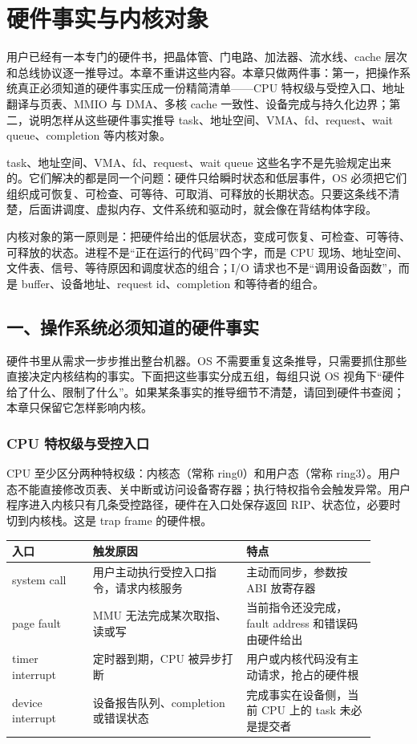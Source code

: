 \chapter{硬件事实与内核对象}

用户已经有一本专门的硬件书，把晶体管、门电路、加法器、流水线、cache 层次和总线协议逐一推导过。本章不重讲这些内容。本章只做两件事：第一，把操作系统真正必须知道的硬件事实压成一份精简清单——CPU 特权级与受控入口、地址翻译与页表、MMIO 与 DMA、多核 cache 一致性、设备完成与持久化边界；第二，说明怎样从这些硬件事实推导 task、地址空间、VMA、fd、request、wait queue、completion 等内核对象。

task、地址空间、VMA、fd、request、wait queue 这些名字不是先验规定出来的。它们解决的都是同一个问题：硬件只给瞬时状态和低层事件，OS 必须把它们组织成可恢复、可检查、可等待、可取消、可释放的长期状态。只要这条线不清楚，后面讲调度、虚拟内存、文件系统和驱动时，就会像在背结构体字段。

\begin{keyidea}
内核对象的第一原则是：把硬件给出的低层状态，变成可恢复、可检查、可等待、可释放的状态。进程不是“正在运行的代码”四个字，而是 CPU 现场、地址空间、文件表、信号、等待原因和调度状态的组合；I/O 请求也不是“调用设备函数”，而是 buffer、设备地址、request id、completion 和等待者的组合。
\end{keyidea}

\section{一、操作系统必须知道的硬件事实}

硬件书里从需求一步步推出整台机器。OS 不需要重复这条推导，只需要抓住那些直接决定内核结构的事实。下面把这些事实分成五组，每组只说 OS 视角下“硬件给了什么、限制了什么”。如果某条事实的推导细节不清楚，请回到硬件书查阅；本章只保留它怎样影响内核。

\subsection{CPU 特权级与受控入口}

CPU 至少区分两种特权级：内核态（常称 ring0）和用户态（常称 ring3）。用户态不能直接修改页表、关中断或访问设备寄存器；执行特权指令会触发异常。用户程序进入内核只有几条受控路径，硬件在入口处保存返回 RIP、状态位，必要时切到内核栈。这是 trap frame 的硬件根。

\begin{longtable}{p{0.2\linewidth}p{0.38\linewidth}p{0.32\linewidth}}
\toprule
入口 & 触发原因 & 特点 \\
\midrule
system call & 用户主动执行受控入口指令，请求内核服务 & 主动而同步，参数按 ABI 放寄存器 \\
page fault & MMU 无法完成某次取指、读或写 & 当前指令还没完成，fault address 和错误码由硬件给出 \\
timer interrupt & 定时器到期，CPU 被异步打断 & 用户或内核代码没有主动请求，抢占的硬件根 \\
device interrupt & 设备报告队列、completion 或错误状态 & 完成事实在设备侧，当前 CPU 上的 task 未必是提交者 \\
\bottomrule
\end{longtable}

